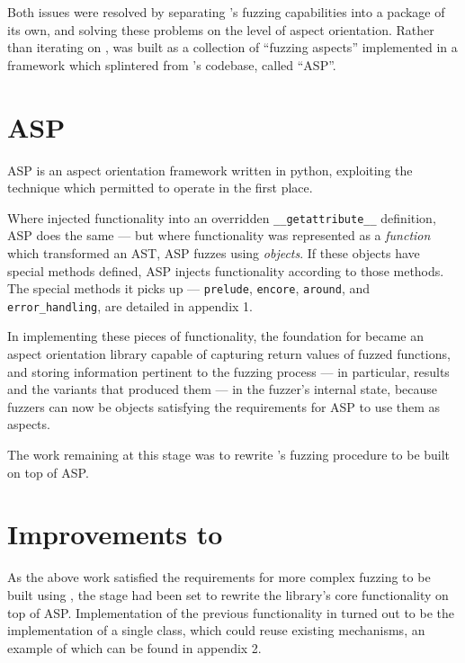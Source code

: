 \documentclass{article}
\begin{document}
Both issues were resolved by separating \pdsf{}'s fuzzing capabilities into a
package of its own, and solving these problems on the level of aspect
  orientation. Rather than iterating on \pdsf{}, \pdsf{} was built as
a collection of ``fuzzing aspects'' implemented in a framework which
splintered from \pdsf{}'s codebase, called ``ASP''.\par


\section{ASP}
ASP\cite{asp_repo} is an aspect orientation framework written in python,
exploiting the technique which permitted \pdsf{} to operate in the first
place.\par

Where \pdsf{} injected functionality into an overridden
\texttt{\_\_getattribute\_\_} definition, ASP does the same --- but where
functionality was represented as a \emph{function} which transformed an AST, ASP
fuzzes using \emph{objects}. If these objects have special methods defined, ASP
injects functionality according to those methods. The special methods it picks
up --- \texttt{prelude}, \texttt{encore}, \texttt{around}, and
\texttt{error\_handling}, are detailed in appendix 1.

In implementing these pieces of functionality, the foundation for \pdsf{} became
an aspect orientation library capable of capturing return values of fuzzed
functions, and storing information pertinent to the fuzzing process --- in
particular, results and the variants that produced them --- in the fuzzer's
internal state, because fuzzers can now be objects satisfying the requirements
for ASP to use them as aspects.\par

The work remaining at this stage was to rewrite \pdsf{}'s fuzzing procedure to
be built on top of ASP.\par


\section{Improvements to \pdsf{}}
\label{sec:pdsf_improvements}
As the above work satisfied the requirements for more complex fuzzing to be
built using \pdsf{}, the stage had been set to rewrite the library's core
functionality on top of ASP. Implementation of the previous functionality in
\pdsf{} turned out to be the implementation of a single class, which could reuse
existing \pdsf{} mechanisms, an example of which can be found in appendix 2.\par
\end{document}
